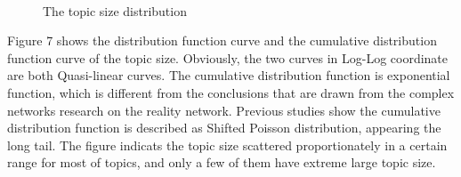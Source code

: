 \documentclass{elsarticle}
\begin{document}
\begin{figure}[htpb]
  \centering
  \subfigure[ ]{
     \scalebox{0.18}{\texttt{[image: 07-1]}}
   } \quad
  \subfigure[ ]{ 
       \scalebox{0.18}{\texttt{[image: 07-2]}}
   } 
   \
    \subfigure[ ]{
     \scalebox{0.18}{\texttt{[image: 07-3]}}
   } \quad
  \subfigure[ ]{ 
       \scalebox{0.18}{\texttt{[image: 07-4]}}
   } 
  

    \subfigure[ ]{
     \scalebox{0.18}{\texttt{[image: 07-5]}}
   } \quad
  \subfigure[ ]{ 
       \scalebox{0.18}{\texttt{[image: 07-6]}}
   } 

    \subfigure[ ]{
     \scalebox{0.18}{\texttt{[image: 07-7]}}
   } \quad
  \subfigure[ ]{ 
       \scalebox{0.18}{\texttt{[image: 07-8]}}
   } 
   \caption{The topic size distribution }
\end{figure}

Figure 7 shows the distribution function curve and the cumulative
distribution function curve of the topic size. Obviously, the two
curves in Log-Log coordinate are both Quasi-linear curves. 
The cumulative distribution function is exponential function,
which is different from the conclusions that are drawn from the
complex networks research on the reality network. Previous studies show
the cumulative distribution function is described as Shifted Poisson
distribution, appearing the long tail. The figure indicats the topic
size scattered proportionately in a certain range for most of topics,
and only a few of them have extreme large topic size.
\end{document}
